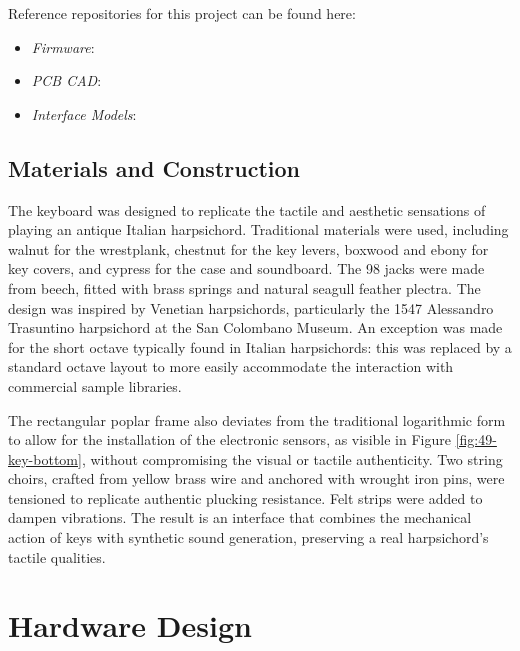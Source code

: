 \begin{anonsuppress}
Reference repositories for this project can be found here:

    \begin{itemize}
        \item 
        \emph{Firmware}: 
        \item 
        \emph{PCB CAD}: 
        \item 
        \emph{Interface Models}: 
    \end{itemize}
\end{anonsuppress}



\subsection{Materials and Construction}

The keyboard was designed to replicate the tactile and aesthetic sensations of playing an antique Italian harpsichord. Traditional materials were used, including walnut for the wrestplank, chestnut for the key levers, boxwood and ebony for key covers, and cypress for the case and soundboard. The 98 jacks were made from beech, fitted with brass springs and natural seagull feather plectra. The design was inspired by Venetian harpsichords, particularly the 1547 Alessandro Trasuntino harpsichord at the San Colombano Museum. An exception was made for the short octave typically found in Italian harpsichords: this was replaced by a standard octave layout to more easily accommodate the interaction with commercial sample libraries. 

The rectangular poplar frame also deviates from the traditional logarithmic form to allow for the installation of the electronic sensors, as visible in Figure \ref{fig:49-key-bottom}, without compromising the visual or tactile authenticity. Two string choirs, crafted from yellow brass wire and anchored with wrought iron pins, were tensioned to replicate authentic plucking resistance. Felt strips were added to dampen vibrations. The result is an interface that combines the mechanical action of keys with synthetic sound generation, preserving a real harpsichord's tactile qualities.


\section{Hardware Design}\label{hardware-design}

